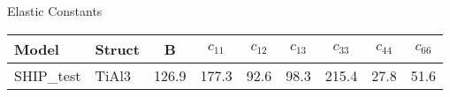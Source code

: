 \documentclass[preview]{standalone}
\begin{document}
    \begin{center}
    \textnormal{Elastic Constants} \\
    \vspace{2mm}
    \begin{tabular}{ l l c c c c c c c } \toprule 
Model & Struct & B & $c_{11}$ & $c_{12}$ & $c_{13}$ & $c_{33}$ & $c_{44}$ & $c_{66}$\\ \midrule 
SHIP\_test & TiAl3 & 126.9 & 177.3 & 92.6 & 98.3 & 215.4 & 27.8 & 51.6\\ 
 \bottomrule
    \end{tabular}
    \end{center}
    
\end{document}
